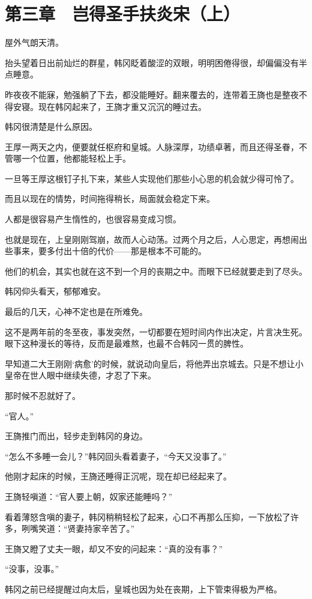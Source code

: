 \section{第三章　岂得圣手扶炎宋（上）}

屋外气朗天清。

抬头望着日出前灿烂的群星，韩冈眨着酸涩的双眼，明明困倦得很，却偏偏没有半点睡意。

昨夜夜不能寐，勉强躺了下去，都没能睡好。翻来覆去的，连带着王旖也是整夜不得安寝。现在韩冈起来了，王旖才重又沉沉的睡过去。

韩冈很清楚是什么原因。

王厚一两天之内，便要就任枢府和皇城。人脉深厚，功绩卓著，而且还得圣眷，不管哪一个位置，他都能轻松上手。

一旦等王厚这根钉子扎下来，某些人实现他们那些小心思的机会就少得可怜了。

而且以现在的情势，时间拖得稍长，局面就会稳定下来。

人都是很容易产生惰性的，也很容易变成习惯。

也就是现在，上皇刚刚驾崩，故而人心动荡。过两个月之后，人心思定，再想闹出些事来，要多付出十倍的代价——那是根本不可能的。

他们的机会，其实也就在这不到一个月的丧期之中。而眼下已经就要走到了尽头。

韩冈仰头看天，郁郁难安。

最后的几天，心神不定也是在所难免。

这不是两年前的冬至夜，事发突然，一切都要在短时间内作出决定，片言决生死。眼下这种漫长的等待，反而是最难熬，也最不合韩冈一贯的脾性。

早知道二大王刚刚‘病愈’的时候，就说动向皇后，将他弄出京城去。只是不想让小皇帝在世人眼中继续失德，才忍了下来。

那时候不忍就好了。

“官人。”

王旖推门而出，轻步走到韩冈的身边。

“怎么不多睡一会儿？”韩冈回头看着妻子，“今天又没事了。”

他刚才起床的时候，王旖还睡得正沉呢，现在却已经起来了。

王旖轻嗔道：“官人要上朝，奴家还能睡吗？”

看着薄怒含嗔的妻子，韩冈稍稍轻松了起来，心口不再那么压抑，一下放松了许多，咧嘴笑道：“贤妻持家辛苦了。”

王旖又瞪了丈夫一眼，却又不安的问起来：“真的没有事？”

“没事，没事。”

韩冈之前已经提醒过向太后，皇城也因为处在丧期，上下管束得极为严格。


